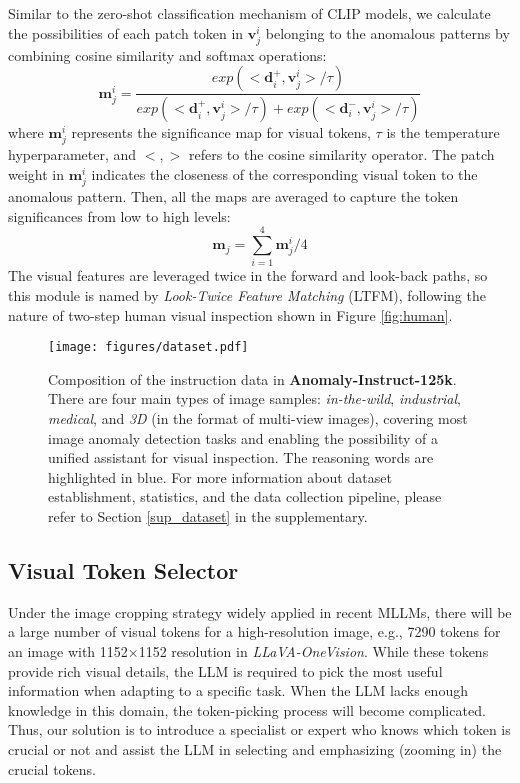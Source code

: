 Similar to the zero-shot classification mechanism of CLIP models, we calculate the possibilities of each patch token in $\mathbf{v}^{i}_{j}$ belonging to the anomalous patterns by combining cosine similarity and softmax operations:
\begin{equation}
    \textbf{m}^{i}_{j}=\frac{exp(<\mathbf{d}^{+}_{i}, \mathbf{v}^{i}_{j}>/\tau)}{exp(<\mathbf{d}^{+}_{i}, \mathbf{v}^{i}_{j}>/\tau)+exp(<\mathbf{d}^{-}_{i}, \mathbf{v}^{i}_{j}>/\tau)}
\end{equation}
where $\textbf{m}^{i}_{j}$ represents the significance map for visual tokens, $\tau$ is the temperature hyperparameter, and $<,>$ refers to the cosine similarity operator. The patch weight in $\textbf{m}^{i}_{j}$ indicates the closeness of the corresponding visual token to the anomalous pattern. Then, all the maps are averaged to capture the token significances from low to high levels:
\begin{equation}
    \textbf{m}_{j}=\sum^{4}_{i=1}\textbf{m}^{i}_{j}/4
\end{equation}
The visual features are leveraged twice in the forward and look-back paths, so this module is named by \textit{Look-Twice Feature Matching} (LTFM), following the nature of two-step human visual inspection shown in Figure \ref{fig:human}.
\begin{figure*}[t]
\centering
    \texttt{[image: figures/dataset.pdf]}
\caption{Composition of the instruction data in \textbf{Anomaly-Instruct-125k}. There are four main types of image samples: \textit{in-the-wild}, \textit{industrial}, \textit{medical}, and \textit{3D} (in the format of multi-view images), covering most image anomaly detection tasks and enabling the possibility of a unified assistant for visual inspection. The reasoning words are highlighted in blue. For more information about dataset establishment, statistics, and the data collection pipeline, please refer to Section \ref{sup_dataset} in the supplementary.} 
\label{fig:daatset}
\vspace{-2mm}
\end{figure*}
\subsection{Visual Token Selector}
\label{vt_selector}
Under the image cropping strategy widely applied in recent MLLMs, there will be a large number of visual tokens for a high-resolution image, e.g., 7290 tokens for an image with 1152$\times$1152 resolution in \textit{LLaVA-OneVision}. While these tokens provide rich visual details, the LLM is required to pick the most useful information when adapting to a specific task. When the LLM lacks enough knowledge in this domain, the token-picking process will become complicated. Thus, our solution is to introduce a specialist or expert who knows which token is crucial or not and assist the LLM in selecting and emphasizing (zooming in) the crucial tokens.

